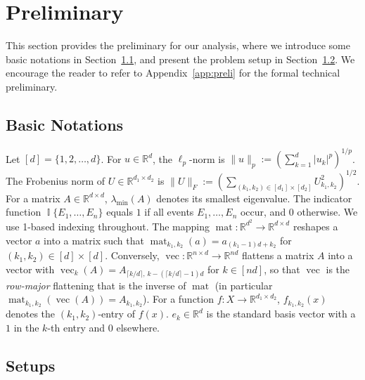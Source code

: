 \documentclass[11pt]{article}
\theoremstyle{plain}
\newcommand{\R}{\mathbb{R}}
\DeclareMathOperator{\I}{\mathbb{I}}
\DeclareMathOperator{\vect}{vec}
\DeclareMathOperator{\matr}{mat}
\begin{document}
\section{Preliminary}\label{sec:preli}


This section provides the preliminary for our analysis, where we introduce some basic notations in Section~\ref{sub:notations}, and present the problem setup in Section~\ref{sub:setups}. We encourage the reader to refer to Appendix~\ref{app:preli} for the formal technical preliminary.


\subsection{Basic Notations}\label{sub:notations}
Let $[d] = \{1, 2, \dots, d\}$. For $u \in \R^d$, the $\ell_p$-norm is $\|u\|_p := ( \sum_{k=1}^d |u_k|^p )^{1/p}$. The Frobenius norm of $U \in \R^{d_1 \times d_2}$ is $\|U\|_F := ( \sum_{(k_1, k_2) \in [d_1] \times [d_2]} U_{k_1, k_2}^2 )^{1/2}$. For a matrix $A \in \R^{d \times d}$, $\lambda_{\min}(A)$ denotes its smallest eigenvalue. The indicator function $\I\{E_1, \dots, E_n\}$ equals $1$ if all events $E_1, \dots, E_n$ occur, and $0$ otherwise. We use 1-based indexing throughout. The mapping $\matr: \R^{d^2} \to \R^{d \times d}$ reshapes a vector $a$ into a matrix such that $\matr_{k_1, k_2}(a) = a_{(k_1-1)d + k_2}$ for $(k_1, k_2) \in [d] \times [d]$. Conversely, $\vect: \R^{n \times d} \to \R^{nd}$ flattens a matrix $A$ into a vector with $\vect_k(A) = A_{\lceil k/d\rceil,\,k - (\lceil k/d\rceil-1)d}$ for $k \in [nd]$, so that $\vect$ is the {\it row-major} flattening that is the inverse of $\matr$ (in particular $\matr_{k_1, k_2}(\vect(A)) = A_{k_1, k_2}$). For a function $f: X \to \R^{d_1 \times d_2}$, $f_{k_1, k_2}(x)$ denotes the $(k_1, k_2)$-entry of $f(x)$. $e_k \in \R^d$ is the standard basis vector with a $1$ in the $k$-th entry and $0$ elsewhere.


\subsection{Setups}\label{sub:setups}
\end{document}
